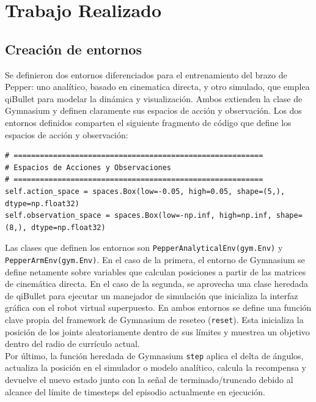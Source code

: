 
\section{Trabajo Realizado}

\subsection{Creación de entornos}

Se definieron dos entornos diferenciados para el entrenamiento del brazo de Pepper: uno analítico, basado en cinematica directa, y otro simulado, que emplea qiBullet para modelar la dinámica y visualización. Ambos extienden la clase de Gymnasium y definen claramente sus espacios de acción y observación. Los dos entornos definidos comparten el siguiente fragmento de código que define los espacios de acción y observación:\\

\begin{lstlisting}
# =========================================================
# Espacios de Acciones y Observaciones
# =========================================================
self.action_space = spaces.Box(low=-0.05, high=0.05, shape=(5,), dtype=np.float32)
self.observation_space = spaces.Box(low=-np.inf, high=np.inf, shape=(8,), dtype=np.float32)
\end{lstlisting}

Las clases que definen los entornos son \texttt{PepperAnalyticalEnv(gym.Env)} y \texttt{PepperArmEnv(gym.Env)}. En el caso de la primera, el entorno de Gymnasium se define netamente sobre variables que calculan posiciones a partir de las matrices de cinemática directa. En el caso de la segunda, se aprovecha una clase heredada de qiBullet para ejecutar un manejador de simulación que inicializa la interfaz gráfica con el robot virtual superpuesto. En ambos entornos se define una función clave propia del framework de Gymnasium de reseteo (\texttt{reset}). Esta inicializa la posición de los joints aleatoriamente dentro de sus límites y muestrea un objetivo dentro del radio de currículo actual. \\

Por último, la función heredada de Gymnasium \texttt{step} aplica el delta de ángulos, actualiza la posición en el simulador o modelo analítico, calcula la recompensa y devuelve el nuevo estado junto con la señal de terminado/truncado debido al alcance del límite de timesteps del episodio actualmente en ejecución.\\

